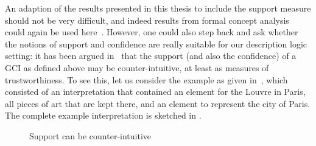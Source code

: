 An adaption of the results presented in this thesis to include the support measure should
not be very difficult, and indeed results from formal concept analysis could again be used
here~\cite{DBLP:conf/ki/StummeTBPL01,arules:Stumme:2002}.  However, one could also step
back and ask whether the notions of support and confidence are really suitable for our
description logic setting: it has been argued in~\cite{DBLP:conf/icdm/BorchmannD11} that
the support (and also the confidence) of a GCI as defined above may be counter-intuitive,
at least as measures of trustworthiness.  To see this, let us consider the example as
given in~\cite{DBLP:conf/icdm/BorchmannD11}, which consisted of an interpretation that
contained an element for the Louvre in Paris, all pieces of art that are kept there, and
an element to represent the city of Paris.  The complete example interpretation is
sketched in .

\begin{figure}[t]
  \centering
  \caption{Support can be counter-intuitive}
  \label{fig:support-of-gcis-can-be-counter-intuitive}
\end{figure}

